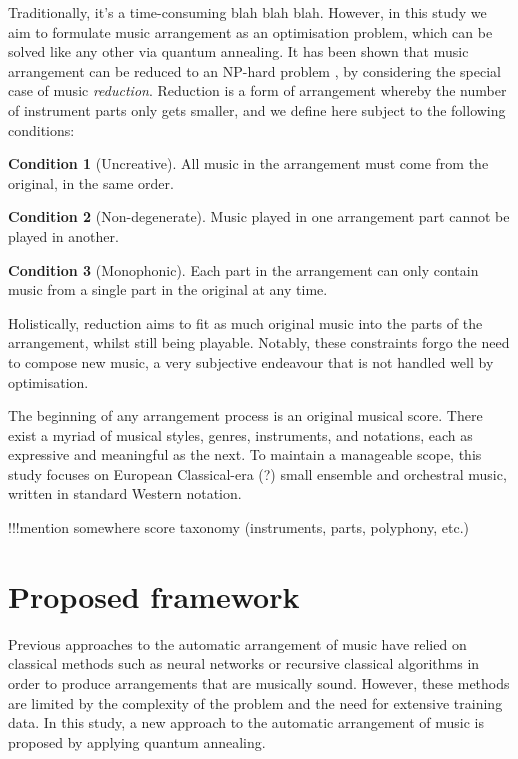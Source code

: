 \documentclass[12pt]{article}
\theoremstyle{definition}
\newtheorem{condition}{Condition}
\begin{document}
Traditionally, it's a time-consuming blah blah blah. However, in this study we aim to formulate music arrangement as an optimisation problem, which can be solved like any other via quantum annealing. It has been shown that music arrangement can be reduced to an NP-hard problem \cite{moses_computational_2016}, by considering the special case of music \emph{reduction}. Reduction is a form of arrangement whereby the number of instrument parts only gets smaller, and we define here subject to the following conditions:

\begin{condition}[Uncreative]
    All music in the arrangement must come from the original, in the same order.
    \label{con:uncreative}
\end{condition}
\begin{condition}[Non-degenerate]
    Music played in one arrangement part cannot be played in another.
    \label{con:non-degenerate}
\end{condition}
\begin{condition}[Monophonic]
    Each part in the arrangement can only contain music from a single part in the original at any time.
    \label{con:monophonic}
\end{condition}

Holistically, reduction aims to fit as much original music into the parts of the arrangement, whilst still being playable. Notably, these constraints forgo the need to compose new music, a very subjective endeavour that is not handled well by optimisation.

The beginning of any arrangement process is an original musical score. There exist a myriad of musical styles, genres, instruments, and notations, each as expressive and meaningful as the next. To maintain a manageable scope, this study focuses on European Classical-era (?) small ensemble and orchestral music, written in standard Western notation.

!!!mention somewhere score taxonomy (instruments, parts, polyphony, etc.)

\section{Proposed framework}

Previous approaches to the automatic arrangement of music have relied on classical methods such as neural networks  or recursive classical algorithms in order to produce arrangements that are musically sound. However, these methods are limited by the complexity of the problem and the need for extensive training data. In this study, a new approach to the automatic arrangement of music is proposed by applying quantum annealing.
\end{document}
